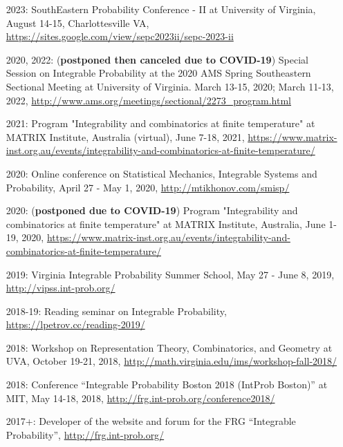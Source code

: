 \documentclass[letterpaper,11pt]{article}
\begin{document}
\begin{itemize}
	\item [2023:] SouthEastern Probability Conference - II at University of Virginia, August 14-15, Charlottesville VA, \url{https://sites.google.com/view/sepc2023ii/sepc-2023-ii}
	\item [2020, 2022:]
	(\textbf{postponed then canceled due to COVID-19})
		Special Session on Integrable Probability
		at the 2020 AMS Spring Southeastern Sectional Meeting at 
		University of Virginia.
		March 13-15, 2020; March 11-13, 2022,
		\url{http://www.ams.org/meetings/sectional/2273_program.html}
	
	\item [2021:]
		Program "Integrability and combinatorics at finite temperature"
		at MATRIX Institute, Australia
		(virtual),
		June 7-18, 2021,
		\url{https://www.matrix-inst.org.au/events/integrability-and-combinatorics-at-finite-temperature/}
	\item [2020:]
	Online conference on Statistical Mechanics, Integrable Systems and Probability,
	April 27 - May 1, 2020,
	\url{http://mtikhonov.com/smisp/}
	\item [2020:]
	(\textbf{postponed due to COVID-19})
	Program "Integrability and combinatorics at finite temperature"
	at MATRIX Institute,
	Australia,
	June 1-19, 2020,
	\url{https://www.matrix-inst.org.au/events/integrability-and-combinatorics-at-finite-temperature/}
	
	\item [2019:]
		Virginia Integrable Probability Summer School,
		May 27 - June 8, 2019,
		\url{http://vipss.int-prob.org/}

	\item[2018-19:]
		Reading seminar on Integrable Probability,
	      \url{https://lpetrov.cc/reading-2019/}
		

	\item [2018:]
		Workshop on Representation Theory, Combinatorics, and Geometry
		at UVA,
		October 19-21, 2018,
		\url{http://math.virginia.edu/ims/workshop-fall-2018/}

	\item [2018:]
		Conference 
		``Integrable Probability Boston 2018 (IntProb Boston)''
		at MIT,
		May 14-18, 2018,
		\url{http://frg.int-prob.org/conference2018/}

	\item [2017+:]
		Developer of the website and forum for the FRG ``Integrable Probability'',
		\url{http://frg.int-prob.org/}


\end{itemize}
\end{document}
